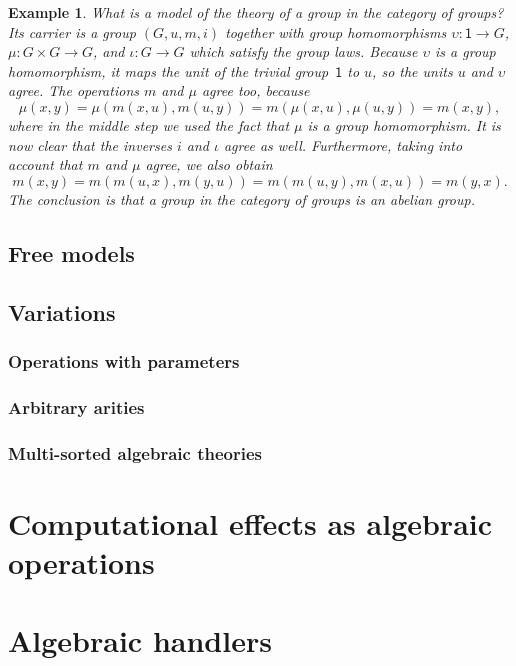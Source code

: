 \documentclass{amsart}
\newcommand{\one}{\mathsf{1}}
\newtheorem{example}[definition]{Example}
\begin{document}
\begin{example}
  What is a model of the theory of a group in the category of groups? Its carrier is a
  group $(G, u, m, i)$ together with group homomorphisms $\upsilon : \one \to G$,
  $\mu : G \times G \to G$, and $\iota : G \to G$ which satisfy the group laws. Because
  $\upsilon$ is a group homomorphism, it maps the unit of the trivial group~$\one$ to $u$,
  so the units $u$ and $\upsilon$ agree. The operations $m$ and $\mu$ agree too, because
  \begin{equation*}
    \mu(x, y) =
    \mu(m(x, u), m(u, y)) =
    m(\mu(x, u), \mu(u, y)) =
    m(x, y),
  \end{equation*}
  where in the middle step we used the fact that $\mu$ is a group homomorphism. It is now
  clear that the inverses $i$ and $\iota$ agree as well. Furthermore, taking into account
  that $m$ and $\mu$ agree, we also obtain
  \begin{equation*}
    m(x, y) =
    m(m(u, x), m(y, u)) =
    m(m(u, y), m(x, u)) =
    m(y, x).
  \end{equation*}
  The conclusion is that a group in the category of groups is an abelian group.
\end{example}

\subsection{Free models}
\label{sec:free-models}




\subsection{Variations}
\label{sec:variations}

\subsubsection{Operations with parameters}
\label{sec:oper-with-param}

\subsubsection{Arbitrary arities}
\label{sec:arbitrary-arities}

\subsubsection{Multi-sorted algebraic theories}
\label{sec:multi-sort-algebr}


\section{Computational effects as algebraic operations}
\label{sec:comp-effects-as}

\section{Algebraic handlers}
\label{sec:algebraic-handlers}
\end{document}
